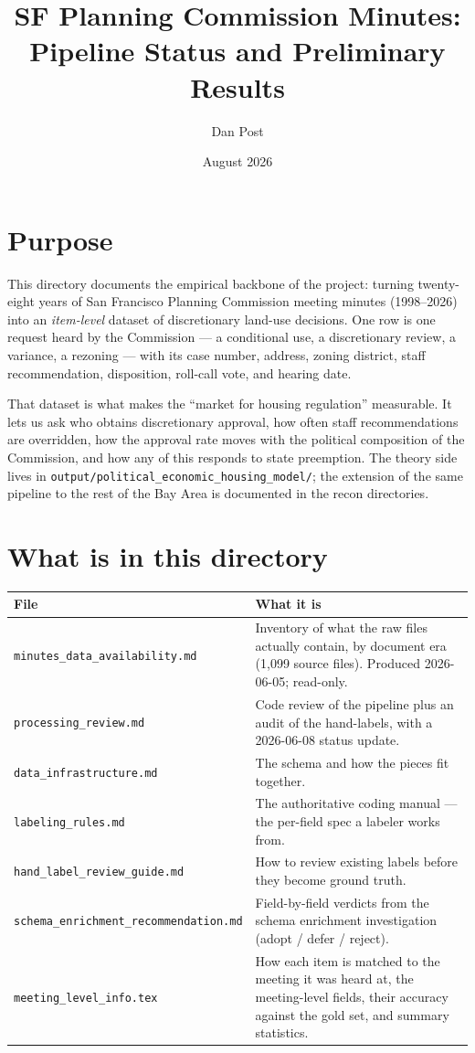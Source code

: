 \documentclass[11pt]{article}
\title{SF Planning Commission Minutes:\\ Pipeline Status and Preliminary Results}
\author{Dan Post}
\date{August 2026}
\begin{document}
\maketitle

\section{Purpose}

This directory documents the empirical backbone of the project: turning twenty-eight years
of San Francisco Planning Commission meeting minutes (1998--2026) into an \emph{item-level}
dataset of discretionary land-use decisions. One row is one request heard by the
Commission --- a conditional use, a discretionary review, a variance, a rezoning --- with
its case number, address, zoning district, staff recommendation, disposition, roll-call
vote, and hearing date.

That dataset is what makes the ``market for housing regulation'' measurable. It lets us
ask who obtains discretionary approval, how often staff recommendations are overridden,
how the approval rate moves with the political composition of the Commission, and how any
of this responds to state preemption. The theory side lives in
\texttt{output/political\_economic\_housing\_model/}; the extension of the same pipeline
to the rest of the Bay Area is documented in the recon directories.

\section{What is in this directory}

\begin{longtable}{p{}p{}}
\toprule
File & What it is \\
\midrule
\endhead
\texttt{minutes\_data\_availability.md} & Inventory of what the raw files actually contain,
by document era (1{,}099 source files). Produced 2026-06-05; read-only. \\
\texttt{processing\_review.md} & Code review of the pipeline plus an audit of the
hand-labels, with a 2026-06-08 status update. \\
\texttt{data\_infrastructure.md} & The schema and how the pieces fit together. \\
\texttt{labeling\_rules.md} & The authoritative coding manual --- the per-field spec a
labeler works from. \\
\texttt{hand\_label\_review\_guide.md} & How to review existing labels before they become
ground truth. \\
\texttt{schema\_enrichment\_recommendation.md} & Field-by-field verdicts from the schema
enrichment investigation (adopt / defer / reject). \\
\texttt{meeting\_level\_info.tex} & How each item is matched to the meeting it was heard at,
the meeting-level fields, their accuracy against the gold set, and summary statistics. \\
\bottomrule
\end{longtable}
\end{document}
